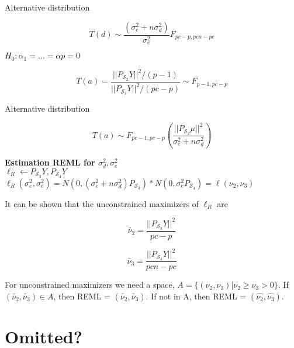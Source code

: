 \documentclass[11pt,fleqn]{book} %
\begin{document}
Alternative distribution

		$$T(d) \sim \frac{(\sigma_e^2 + n \sigma^2_d)}{\sigma^2_e} F_{pc- p, pcn - pc} $$

$H_0: \alpha_1 = \dots = \alpha p = 0$
		

		$$T(a) = \frac{||P_{\mathcal{S}_2}Y||^2/(p-1)}{||P_{\mathcal{S}_3}Y||^2/(pc-p)} \sim F_{p- 1, pc - p}$$

Alternative distribution

		$$T(a) \sim F_{pc- 1, pc - p} \left(\frac{||P_{\mathcal{S}_2} \mu||^2}{\sigma_e^2 + n \sigma_d^2}\right)$$

\textbf{Estimation REML for $\sigma_d^2, \sigma^2_e$}\\

$\ell_R \leftarrow P_{\mathcal{S}_3}Y, P_{\mathcal{S}_4}Y$\\

$\ell_R(\sigma^2_e, \sigma^2_e) = N(0, (\sigma^2_e+ n \sigma^2_d) P_{\mathcal{S}_3}) * N(0, \sigma_e^2 P_{\mathcal{S}_4}) = \ell(\nu_2, \nu_3)$

It can be shown that the unconstrained maximizers of $\ell_R$ are

		$$\tilde{\nu_2} = \frac{||P_{\mathcal{S}_3}Y||^2}{pc-p} $$

		$$\tilde{\nu_3} = \frac{||P_{\mathcal{S}_4}Y||^2}{pcn-pc} $$

For unconstrained maximizers we need a space, $A= \{(\nu_2, \nu_3) | \nu_2 \geq \nu_3 > 0\}$. If $(\tilde{\nu_2}, \tilde{\nu_3}) \in A$, then REML = $(\tilde{\nu_2}, \tilde{\nu_3})$. If not in A, then REML = $(\hat{\nu_2}, \hat{\nu_3})$.




 \chapter{Omitted?}




\end{document}
